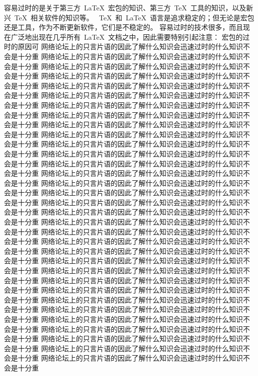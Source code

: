 容易过时的是关于第三方~\LaTeX~宏包的知识、第三方~\TeX~工具的知识，以及新兴~\TeX~相关软件的知识等。
~\TeX~和~\LaTeX~语言是追求稳定的；但无论是宏包还是工具，作为不断更新软件，它们是不稳定的。
容易过时的技术很多，而且现在广泛地出现在几乎所有~\LaTeX~文档之中，因此需要特别引起注意：
宏包的过时的原因可
网络论坛上的只言片语的因此了解什么知识会迅速过时的什么知识不会是十分重
网络论坛上的只言片语的因此了解什么知识会迅速过时的什么知识不会是十分重
网络论坛上的只言片语的因此了解什么知识会迅速过时的什么知识不会是十分重
网络论坛上的只言片语的因此了解什么知识会迅速过时的什么知识不会是十分重
网络论坛上的只言片语的因此了解什么知识会迅速过时的什么知识不会是十分重
网络论坛上的只言片语的因此了解什么知识会迅速过时的什么知识不会是十分重
网络论坛上的只言片语的因此了解什么知识会迅速过时的什么知识不会是十分重
网络论坛上的只言片语的因此了解什么知识会迅速过时的什么知识不会是十分重
网络论坛上的只言片语的因此了解什么知识会迅速过时的什么知识不会是十分重
网络论坛上的只言片语的因此了解什么知识会迅速过时的什么知识不会是十分重
网络论坛上的只言片语的因此了解什么知识会迅速过时的什么知识不会是十分重
网络论坛上的只言片语的因此了解什么知识会迅速过时的什么知识不会是十分重
网络论坛上的只言片语的因此了解什么知识会迅速过时的什么知识不会是十分重
网络论坛上的只言片语的因此了解什么知识会迅速过时的什么知识不会是十分重
网络论坛上的只言片语的因此了解什么知识会迅速过时的什么知识不会是十分重
网络论坛上的只言片语的因此了解什么知识会迅速过时的什么知识不会是十分重
网络论坛上的只言片语的因此了解什么知识会迅速过时的什么知识不会是十分重
网络论坛上的只言片语的因此了解什么知识会迅速过时的什么知识不会是十分重
网络论坛上的只言片语的因此了解什么知识会迅速过时的什么知识不会是十分重
网络论坛上的只言片语的因此了解什么知识会迅速过时的什么知识不会是十分重
网络论坛上的只言片语的因此了解什么知识会迅速过时的什么知识不会是十分重
网络论坛上的只言片语的因此了解什么知识会迅速过时的什么知识不会是十分重
网络论坛上的只言片语的因此了解什么知识会迅速过时的什么知识不会是十分重
网络论坛上的只言片语的因此了解什么知识会迅速过时的什么知识不会是十分重
网络论坛上的只言片语的因此了解什么知识会迅速过时的什么知识不会是十分重
网络论坛上的只言片语的因此了解什么知识会迅速过时的什么知识不会是十分重
网络论坛上的只言片语的因此了解什么知识会迅速过时的什么知识不会是十分重
网络论坛上的只言片语的因此了解什么知识会迅速过时的什么知识不会是十分重
网络论坛上的只言片语的因此了解什么知识会迅速过时的什么知识不会是十分重
网络论坛上的只言片语的因此了解什么知识会迅速过时的什么知识不会是十分重
网络论坛上的只言片语的因此了解什么知识会迅速过时的什么知识不会是十分重
网络论坛上的只言片语的因此了解什么知识会迅速过时的什么知识不会是十分重
网络论坛上的只言片语的因此了解什么知识会迅速过时的什么知识不会是十分重
